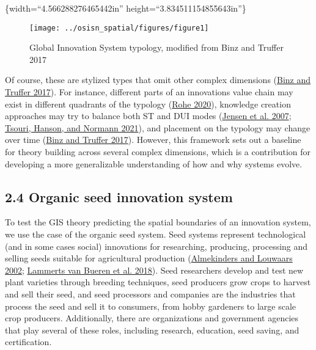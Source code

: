 \documentclass[twoside,12pt,final]{ucthesis-CA2012}
\begin{document}
\begin{ucmainmatter}
\{width=``4.566288276465442in''
height=``3.834511154855643in''\}
\begin{figure}

{\centering \texttt{[image: ../osisn\_spatial/figures/figure1]} 

}

\caption{Global Innovation System typology, modified from Binz and Truffer 2017}\label{fig:unnamed-chunk-14}
\end{figure}
Of course, these are stylized types that omit other complex dimensions
(\protect\hyperlink{ref-Binz_Truffer_2017}{Binz and Truffer 2017}). For
instance, different parts of an innovation\textquotesingle s value chain may exist in
different quadrants of the typology
(\protect\hyperlink{ref-Rohe_2020}{Rohe 2020}), knowledge
creation approaches may try to balance both ST and DUI modes
(\protect\hyperlink{ref-Jensen_Johnson_Lorenz_Lundvall_2007}{Jensen et al. 2007}; \protect\hyperlink{ref-Tsouri_Hanson_Normann_2021}{Tsouri, Hanson, and Normann 2021}),
and placement on the typology may change over time
(\protect\hyperlink{ref-Binz_Truffer_2017}{Binz and Truffer 2017}).
However, this framework sets out a baseline for theory building across
several complex dimensions, which is a contribution for developing a
more generalizable understanding of how and why systems evolve.

\hypertarget{organic-seed-innovation-system}{%
\subsection{2.4 Organic seed innovation system}\label{organic-seed-innovation-system}}

To test the GIS theory predicting the spatial boundaries of an
innovation system, we use the case of the organic seed system. Seed
systems represent technological (and in some cases social) innovations
for researching, producing, processing and selling seeds suitable for
agricultural production (\protect\hyperlink{ref-Almekinders_Louwaars_2002}{Almekinders and Louwaars 2002}; \protect\hyperlink{ref-Lammerts_van_Bueren_Struik_van_Eekeren_Nuijten_2018}{Lammerts van Bueren et al. 2018}). Seed
researchers develop and test new plant varieties through breeding
techniques, seed producers grow crops to harvest and sell their seed,
and seed processors and companies are the industries that process the
seed and sell it to consumers, from hobby gardeners to large scale crop
producers. Additionally, there are organizations and government agencies
that play several of these roles, including research, education, seed
saving, and certification.


\end{ucmainmatter}
\end{document}
